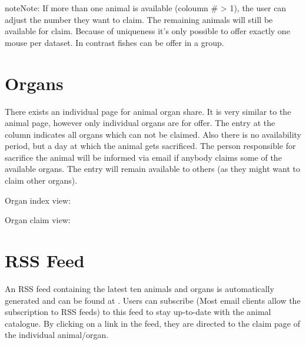 \documentclass[letterpaper,10pt,openany,oneside,english]{sphinxmanual}
\begin{document}
\begin{sphinxadmonition}{note}{Note:}
If more than one animal is available (coloumn \# \textgreater{} 1), the user can adjust the number they want to claim.
The remaining animals will still be available for claim. Because of uniqueness it’s only
possible to offer exactly one mouse per dataset. In contrast fishes can be offer in a group.
\end{sphinxadmonition}

\noindent{}


\section{Organs}
\label{\detokenize{index:organs}}
There exists an individual page for animal organ share. It is very similar to the animal page,
however only individual organs are for offer. The entry at the column  indicates
all organs which can not be claimed. Also there is no availability period, but a day at
which the animal gets sacrificed. The person responsible for sacrifice the animal will be informed via
email if anybody claims some of the available organs. The entry will remain available to others (as
they might want to claim other organs).

Organ index view:

\noindent{}

Organ claim view:

\noindent{}


\section{RSS Feed}
\label{\detokenize{index:rss-feed}}
An RSS feed containing the latest ten animals and organs is automatically generated and can be found at
. Users can subscribe (Most email clients allow the subscription
to RSS feeds) to this feed to stay up-to-date with the animal catalogue. By clicking on a link in
the feed, they are directed to the claim page of the individual animal/organ.

\noindent{}
\end{document}
